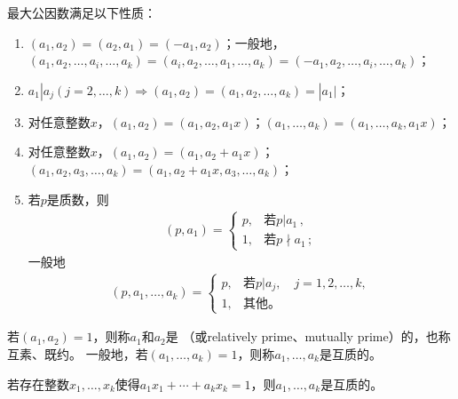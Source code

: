 \begin{theorem}\label{theorem:7.ex02.6}
    最大公因数满足以下性质：
    \begin{enumerate}
        \item $(a_1,a_2)=(a_2,a_1)=(-a_1,a_2)$；一般地，\\
              $(a_1,a_2,\ldots,a_i,\ldots,a_k)=(a_i,a_2,\ldots,a_1,\ldots,a_k)=(-a_1,a_2,\ldots,a_i,\ldots,a_k)$；
        \item $a_1|a_j(j=2,\ldots,k)\Rightarrow (a_1,a_2)=(a_1,a_2,\ldots,a_k)=|a_1|$；
        \item 对任意整数$x$，$(a_1,a_2)=(a_1,a_2,a_1x)$；$(a_1,\ldots,a_k)=(a_1,\ldots,a_k,a_1x)$；
        \item 对任意整数$x$，$(a_1,a_2)=(a_1,a_2+a_1x)$；\\
              $(a_1,a_2,a_3,\ldots,a_k)=(a_1,a_2+a_1x,a_3,\ldots,a_k)$；
        \item 若$p$是质数，则
              \begin{align}
                  (p,a_1)=\left\{
                  \begin{array}{ll}
                      p, & \text{若}p|a_1\, ,      \\
                      1, & \text{若}p\nmid a_1\, ;
                  \end{array}
                  \right.
              \end{align}
              一般地
              \begin{align}
                  (p,a_1,\ldots,a_k)=\left\{
                  \begin{array}{ll}
                      p, & \text{若}p|a_j,\quad j=1,2,\ldots,k, \\
                      1, & \text{其他。}
                  \end{array}
                  \right.
              \end{align}
    \end{enumerate}
\end{theorem}
\begin{definition}
    若$(a_1,a_2)=1$，则称$a_1$和$a_2$是
    （或relatively prime、mutually prime）的，也称{\sffamily 互素}、{\sffamily 既约}。
    一般地，若$(a_1,\ldots,a_k)=1$，则称$a_1,\ldots,a_k$是互质的。
\end{definition}
\begin{theorem}\label{theorem:7.ex02.7}
    若存在整数$x_1,\ldots,x_k$使得$a_1x_1+\cdots+a_kx_k=1$，则$a_1,\ldots,a_k$是互质的。
\end{theorem}
